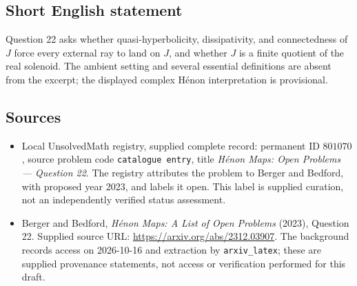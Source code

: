 \documentclass[11pt]{article}
\begin{document}
\subsection{Short English statement}
Question 22 asks whether quasi-hyperbolicity, dissipativity, and connectedness of \(J\) force every external ray to land on \(J\), and whether \(J\) is a finite quotient of the real solenoid. The ambient setting and several essential definitions are absent from the excerpt; the displayed complex H\'enon interpretation is provisional.
\subsection{Sources}
\begin{itemize}
\item Local UnsolvedMath registry, supplied complete record: permanent ID \(801070\), source problem code \texttt{catalogue entry}, title \emph{H\'enon Maps: Open Problems --- Question 22}. The registry attributes the problem to Berger and Bedford, with proposed year 2023, and labels it open. This label is supplied curation, not an independently verified status assessment.
\item Berger and Bedford, \emph{H\'enon Maps: A List of Open Problems} (2023), Question 22. Supplied source URL: \url{https://arxiv.org/abs/2312.03907}. The background records access on 2026-10-16 and extraction by \texttt{arxiv\_latex}; these are supplied provenance statements, not access or verification performed for this draft.
\end{itemize}
\end{document}
